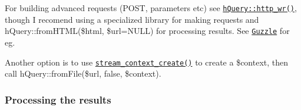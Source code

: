 For building advanced requests (P\+O\+ST, parameters etc) see \href{https://duzun.github.io/hQuery.php/docs/class-hQuery.html#_http_wr}{\tt h\+Query\+::http\+\_\+wr()}, though I recomend using a specialized library for making requests and {\ttfamily h\+Query\+::from\+H\+T\+ML(\$html, \$url=N\+U\+LL)} for processing results. See \href{http://docs.guzzlephp.org/en/stable/}{\tt Guzzle} for eg.

Another option is to use \href{https://secure.php.net/manual/en/function.stream-context-create.php}{\tt stream\+\_\+context\+\_\+create()} to create a {\ttfamily \$context}, then call {\ttfamily h\+Query\+::from\+File(\$url, false, \$context)}.

\subsubsection*{Processing the results}

